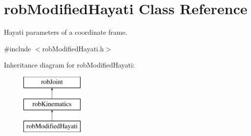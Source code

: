 \hypertarget{classrob_modified_hayati}{}\section{rob\+Modified\+Hayati Class Reference}
\label{classrob_modified_hayati}


Hayati parameters of a coordinate frame.  




{\ttfamily \#include $<$rob\+Modified\+Hayati.\+h$>$}

Inheritance diagram for rob\+Modified\+Hayati\+:\begin{figure}[H]
\begin{center}
\leavevmode
\includegraphics[height=3.000000cm]{d6/d44/classrob_modified_hayati}
\end{center}
\end{figure}
